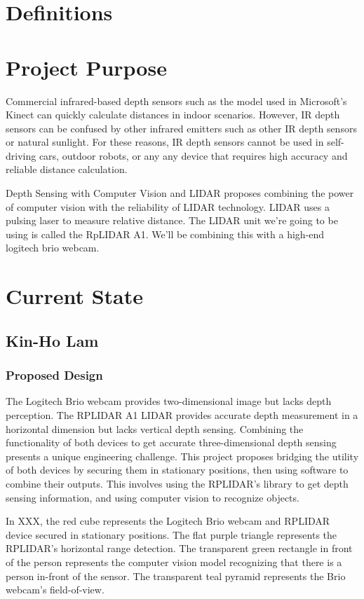 \documentclass[onecolumn, draftclsnofoot,10pt, compsoc]{IEEEtran}
\begin{document}
\begin{singlespace}
	\section{Definitions}

	\section{Project Purpose}
		Commercial infrared-based depth sensors such as the model used in Microsoft’s Kinect can quickly calculate distances in indoor scenarios.
		However, IR depth sensors can be confused by other infrared emitters such as other IR depth sensors or natural sunlight.
		For these reasons, IR depth sensors cannot be used in self-driving cars, outdoor robots, or any any device that requires high accuracy and reliable distance calculation.

		Depth Sensing with Computer Vision and LIDAR proposes combining the power of computer vision with the reliability of LIDAR technology.
		LIDAR uses a pulsing laser to measure relative distance.
		The LIDAR unit we're going to be using is called the RpLIDAR A1.
		We'll be combining this with a high-end logitech brio webcam.

	\section{Current State}

	\subsection{Kin-Ho Lam}
		\subsubsection{Proposed Design}
			The Logitech Brio webcam provides two-dimensional image but lacks depth perception.
			The RPLIDAR A1 LIDAR provides accurate depth measurement in a horizontal dimension but lacks vertical depth sensing.
			Combining the functionality of both devices to get accurate three-dimensional depth sensing presents a unique engineering challenge.
			This project proposes bridging the utility of both devices by securing them in stationary positions, then using software to combine their outputs.
			This involves using the RPLIDAR’s library to get depth sensing information, and using computer vision to recognize objects.

			In XXX, the red cube represents the Logitech Brio webcam and RPLIDAR device secured in stationary positions.
			The flat purple triangle represents the RPLIDAR’s horizontal range detection.
			The transparent green rectangle in front of the person represents the computer vision model recognizing that there is a person in-front of the sensor.
			The transparent teal pyramid represents the Brio webcam’s field-of-view.
			

\end{singlespace}
\end{document}
